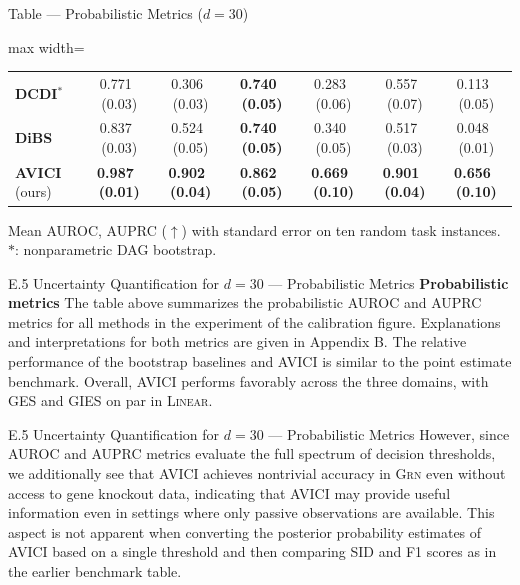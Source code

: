 \documentclass[aspectratio=169,10pt]{beamer}
\newcommand{\err}[1]{\tiny{$\,$(#1)}}
\newcommand{\highlight}[1]{\textbf{#1}}
\newcommand{\domain}[1]{\textsc{#1}}
\newcommand{\lineardomain}{\domain{Linear}\xspace}
\newcommand{\grndomain}{\domain{Grn}\xspace}
\newcommand{\dcdi}{\textbf{DCDI}}
\newcommand{\dibs}{\textbf{DiBS}}
\newcommand{\oursinterv}{\textbf{AVICI} (ours)}
\newcommand{\ours}{AVICI\xspace}
\begin{document}
\begin{frame}{Table --- Probabilistic Metrics ($d=30$)}
\begin{adjustbox}{max width=\textwidth}
\begin{tabular}{lcccccc}
\dcdi${}^*$      &              0.771 \err{0.03} &              0.306 \err{0.03} &  \highlight{0.740 \err{0.05}} &              0.283 \err{0.06} &              0.557 \err{0.07} &              0.113 \err{0.05} \\
\dibs             &              0.837 \err{0.03} &              0.524 \err{0.05} &  \highlight{0.740 \err{0.05}}      &              0.340 \err{0.05} &              0.517 \err{0.03} &              0.048 \err{0.01} \\
\oursinterv      &  \highlight{0.987 \err{0.01}} &  \highlight{0.902 \err{0.04}} &  \highlight{0.862 \err{0.05}} &  \highlight{0.669 \err{0.10}} &  \highlight{0.901 \err{0.04}} &  \highlight{0.656 \err{0.10}} \\
\bottomrule
\end{tabular}
\end{adjustbox}

\vspace{0.2cm}
{\footnotesize Mean AUROC, AUPRC ($\uparrow$) with standard error on ten random task instances. $*$: nonparametric DAG bootstrap.}
\end{frame}

\begin{frame}{E.5 Uncertainty Quantification for $d=30$ --- Probabilistic Metrics}
\small
\textbf{Probabilistic metrics}\quad
The table above summarizes the probabilistic AUROC and AUPRC metrics for all methods in the experiment of the calibration figure. Explanations and interpretations for both metrics are given in Appendix B. The relative performance of the bootstrap baselines and \ours is similar to the point estimate benchmark. Overall, \ours performs favorably across the three domains, with GES and GIES on par in \lineardomain.
\end{frame}

\begin{frame}{E.5 Uncertainty Quantification for $d=30$ --- Probabilistic Metrics}
\small
However, since AUROC and AUPRC metrics evaluate the full spectrum of decision thresholds, we additionally see that \ours achieves nontrivial accuracy in \grndomain even without access to gene knockout data, indicating that \ours may provide useful information even in settings where only passive observations are available. This aspect is not apparent when converting the posterior probability estimates of \ours based on a single threshold and then comparing SID and F1 scores as in the earlier benchmark table.
\end{frame}
\end{document}
